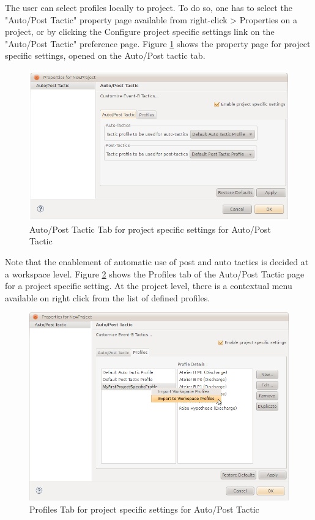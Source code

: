 The user can select profiles locally to project. To do so, one has to select the "Auto/Post Tactic" property page available from right-click > Properties on a project, or by clicking the Configure project specific settings link on the "Auto/Post Tactic" preference page. Figure \ref{fig_ref_01_preferences11} shows the property page for project specific settings, opened on the Auto/Post tactic tab.

\begin{figure}[!h]
\begin{center}
	\includegraphics{img/reference/ref_01_preferences11.png}
	\caption{Auto/Post Tactic Tab for project specific settings for Auto/Post Tactic}
	\label{fig_ref_01_preferences11}
\end{center}
\end{figure}

Note that the enablement of automatic use of post and auto tactics is decided at a workspace level. Figure \ref{fig_ref_01_preferences12} shows the Profiles tab of the Auto/Post Tactic page for a project specific setting. At the project level, there is a contextual menu available on right click from the list of defined profiles. 

\begin{figure}[!h]
\begin{center}
	\includegraphics{img/reference/ref_01_preferences12.png}
	\caption{Profiles Tab for project specific settings for Auto/Post Tactic}
	\label{fig_ref_01_preferences12}
\end{center}
\end{figure}

